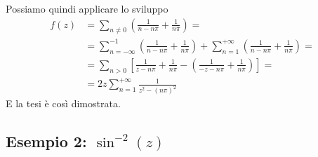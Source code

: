 Possiamo quindi applicare lo sviluppo
\begin{align}
	f(z) &= \sum_{n\neq 0} \left( \frac{1}{n-n\pi} + \frac{1}{n\pi} \right) = \nonumber\\
	&= \sum_{n=-\infty}^{-1} \left( \frac{1}{n-n\pi} + \frac{1}{n\pi} \right) + \sum_{n=1}^{+\infty} \left( \frac{1}{n-n\pi} + \frac{1}{n\pi} \right) = \nonumber \\
	&= \sum_{n>0} \left[ \frac{1}{z-n\pi} + \frac{1}{n\pi} - \left( \frac{1}{-z-n\pi} + \frac{1}{n\pi} \right) \right] = \nonumber\\
	&= 2z\sum_{n=1}^{+\infty} \frac{1}{z^2 - (n\pi)^2}
\end{align}
E la tesi è così dimostrata.

\newpage

\subsection{Esempio 2: $\sin^{-2}(z)$}

